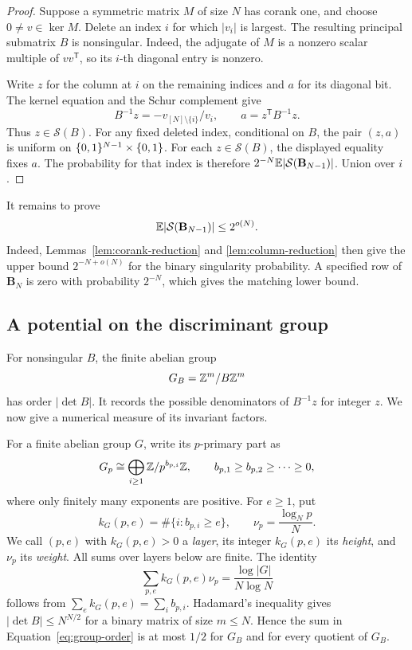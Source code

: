 \begin{proof}
Suppose a symmetric matrix \(M\) of size \(N\) has corank one, and
choose \(0\ne v\in\ker M\). Delete an index \(i\) for which \(|v_i|\)
is largest. The resulting principal submatrix \(B\) is nonsingular.
Indeed, the adjugate of \(M\) is a nonzero scalar multiple of
\(vv^{\mathsf T}\), so its \(i\)-th diagonal entry is nonzero.

Write \(z\) for the column at \(i\) on the remaining indices and \(a\)
for its diagonal bit. The kernel equation and the Schur complement give
\[
 B^{-1}z=-v_{[N]\setminus\{i\}}/v_i,\qquad
 a=z^{\mathsf T}B^{-1}z.
\]
Thus \(z\in\mathcal S(B)\). For any fixed deleted index, conditional on
\(B\), the pair \((z,a)\) is uniform on \(\{0,1\}^{N-1}\times\{0,1\}\).
For each \(z\in\mathcal S(B)\), the displayed equality fixes \(a\).
The probability for that index is therefore
\(2^{-N}\mathbb E|\mathcal S(\mathbf B_{N-1})|\). Union over \(i\).
\end{proof}

It remains to prove
\begin{equation}\label{eq:column-target}
 \mathbb E|\mathcal S(\mathbf B_{N-1})|\le 2^{o(N)}.
\end{equation}
Indeed, Lemmas~\ref{lem:corank-reduction} and
\ref{lem:column-reduction} then give the upper bound \(2^{-N+o(N)}\)
for the binary singularity probability. A specified row of
\(\mathbf B_N\) is zero with probability \(2^{-N}\), which gives the
matching lower bound.

\subsection{A potential on the discriminant group}

For nonsingular \(B\), the finite abelian group
\[
 G_B=\mathbb Z^m/B\mathbb Z^m
\]
has order \(|\det B|\). It records the possible denominators of
\(B^{-1}z\) for integer \(z\). We now give a numerical measure of its
invariant factors.

For a finite abelian group \(G\), write its \(p\)-primary part as
\[
 G_p\cong\bigoplus_{i\ge1}\mathbb Z/p^{b_{p,i}}\mathbb Z,\qquad
 b_{p,1}\ge b_{p,2}\ge\cdots\ge0,
\]
where only finitely many exponents are positive. For \(e\ge1\), put
\[
 k_G(p,e)=\#\{i:b_{p,i}\ge e\},\qquad
 \nu_p=\frac{\log_N p}{N}.
\]
We call \((p,e)\) with \(k_G(p,e)>0\) a \emph{layer}, its integer
\(k_G(p,e)\) its \emph{height}, and \(\nu_p\) its \emph{weight}.
All sums over layers below are finite. The identity
\begin{equation}\label{eq:group-order}
 \sum_{p,e} k_G(p,e)\nu_p=\frac{\log|G|}{N\log N}
\end{equation}
follows from \(\sum_e k_G(p,e)=\sum_i b_{p,i}\).
Hadamard's inequality gives \(|\det B|\le N^{N/2}\) for a binary
matrix of size \(m\le N\). Hence the sum in
Equation~\eqref{eq:group-order} is at most \(1/2\) for \(G_B\) and
for every quotient of \(G_B\).

